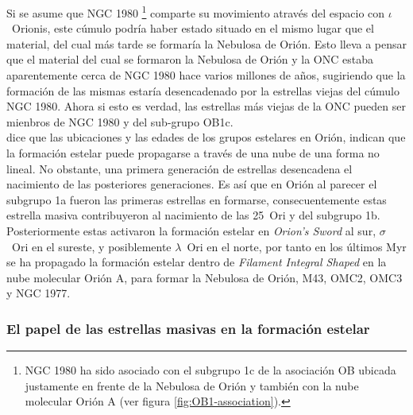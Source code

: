 \documentclass{article}
\begin{document}
Si se asume que NGC 1980 \footnote{NGC 1980 ha sido asociado con el subgrupo 1c de la asociación OB ubicada justamente en frente de la Nebulosa de Orión y también con la nube molecular Orión A (ver figura \ref{fig:OB1-association}).} comparte su movimiento através del espacio con \(\iota\)~Orionis, este cúmulo podría haber estado situado en el mismo lugar que el material, del cual más tarde se formaría la Nebulosa de Orión. Esto lleva a pensar que el material del cual se formaron la Nebulosa de Orión y la ONC estaba aparentemente cerca de NGC 1980 hace varios millones de años, sugiriendo que la formación de las mismas estaría desencadenado por la estrellas viejas del cúmulo NGC 1980. Ahora si esto es verdad, las estrellas más viejas de la ONC pueden ser mienbros de NGC 1980 y del sub-grupo OB1c.\\

\citet{Bally:2008a} dice que las ubicaciones y las edades de los grupos estelares en Orión, indican que la formación estelar puede propagarse a través de una nube de una forma no lineal. No obstante, una primera generación de estrellas desencadena el nacimiento de las posteriores generaciones. Es así que en Orión al parecer el subgrupo 1a fueron las primeras estrellas en formarse, consecuentemente estas estrella masiva contribuyeron al nacimiento de las 25~Ori y del subgrupo 1b. Posteriormente estas activaron la formación estelar en \textit{Orion's Sword} al sur, \(\sigma\)~Ori en el sureste, y posiblemente \(\lambda\)~Ori en el norte, por tanto en los últimos Myr se ha propagado la formación estelar dentro de \textit{Filament Integral Shaped} en la nube molecular Orión A, para formar la Nebulosa de Orión, M43, OMC2, OMC3 y NGC 1977.\\ 

\subsubsection{El papel de las estrellas masivas en la formación estelar}
\label{sec:star-masivas}
\end{document}
